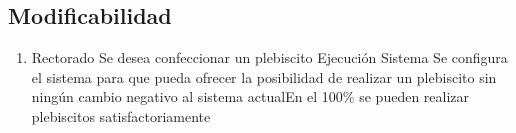 \subsection{Modificabilidad}


\begin{enumerate}
 
\item  {}
{Rectorado}
{Se desea confeccionar un plebiscito}
{Ejecución}
{Sistema}
{Se configura el sistema para que pueda ofrecer la posibilidad de realizar un plebiscito sin ning\'un cambio negativo al sistema actual}{En el 100\% se pueden realizar plebiscitos satisfactoriamente}

\end{enumerate}
